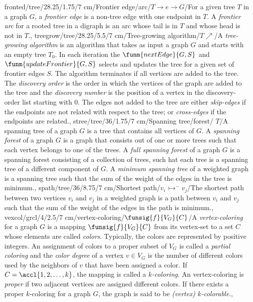 fronted/tree/28.25/1.75/7 cm/{Frontier edge/arc}/{$T\rightarrow e\rightarrow G$}/{For a given tree $T$ in a graph $G$, a \emph{frontier edge} is a non-tree edge with one endpoint in $T$. A \emph{frontier arc} for a rooted tree in a digraph is an arc whose tail is in $T$ and whose head is not in $T$.},
treegrow/tree/28.25/5.5/7 cm/{Tree-growing algorithm}/{$T\nearrow$}/{A \emph{tree-growing algorithm} is an algorithm that takes as input a graph $G$ and starts with an empty tree $T_0$. In each iteration the $\funm{nextEdge}{G,S}$ and $\funm{updateFrontier}{G,S}$ selects and updates the tree for a given set of frontier edges $S$. The algorithm terminates if all vertices are added to the tree. The \emph{discovery order} is the order in which the vertices of the graph are added to the tree and the \emph{discovery number} is the position of a vertex in the discovery-order list starting with $0$. The edges not added to the tree are either \emph{skip-edges} if the endpoints are not related with respect to the tree; or \emph{cross-edges} if the endpoints are related.},
stree/tree/36/1.75/7 cm/{Spanning tree/forest}/{\spanning{} $T$}/{A spanning tree of a graph $G$ is a tree that contains all vertices of $G$. A \emph{spanning forest} of a graph $G$ is a graph that consists out of one or more trees such that each vertex belongs to one of the trees. A \emph{full spanning forest} of a graph $G$ is a spanning forest consisting of a collection of trees, such hat each tree is a spanning tree of a different component of $G$. A \emph{minimum spanning tree} of a weighted graph is a spanning tree such that the sum of the weight of the edges in the tree is minimum.},%
spath/tree/36/8.75/7 cm/{Shortest path}/{$v_i\rightarrowtail^{-} v_j$}/{The shortest path between two vertices $v_i$ and $v_j$ in a weighted graph is a path between $v_i$ and $v_j$ such that the sum of the weight of the edges in the path is minimum.},%
vexcol/grcl/4/2.5/7 cm/{vertex-coloring}/{$\funsig{f}{V_G}{C}$}/{A \emph{vertex-coloring} for a graph $G$ is a mapping $\funsig{f}{V_G}{C}$ from its vertex-set to a set $C$ whose elements are called \emph{colors}. Typically, the colors are represented by positive integers. An assignment of colors to a proper subset of $V_G$ is called a \emph{partial coloring} and the \emph{color degree} of a vertex $v\in V_G$ is the number of different colors used by the neighbors of $v$ that have been assigned a color. If $C=\accl{1,2,\ldots,k}$, the mapping is called a \emph{$k$-coloring}. An vertex-coloring is \emph{proper} if two adjacent vertices are assigned different colors. If there exists a proper $k$-coloring for a graph $G$, the graph is said to be \emph{(vertex) $k$-colorable}.},
